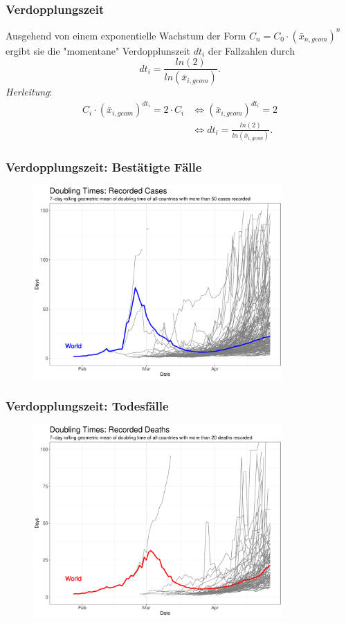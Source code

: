 \documentclass{beamer}
\begin{document}
\begin{frame}
	\frametitle{Verdopplungszeit}
	Ausgehend von einem exponentielle Wachstum der Form $C_n = C_0 \cdot (\bar{x}_{n, geom})^{n}$ ergibt sie die "momentane" Verdopplunszeit $dt_i$ der Fallzahlen durch $$dt_i = \frac{ln(2)}{ln(\bar{x}_{i, geom})}.$$
	\pause
	\emph{Herleitung}: 
	\begin{align*} C_i \cdot (\bar{x}_{i, geom})^{dt_i} = 2 \cdot C_i 
		 &\iff (\bar{x}_{i, geom})^{dt_i} = 2 \\
	 	&\iff dt_i = \frac{ln(2)}{ln(\bar{x}_{i, geom})}.
	\end{align*}
\end{frame}

\begin{frame}
	\frametitle{Verdopplungszeit: Bestätigte Fälle}
	\begin{figure}
		\centering
		\includegraphics[width = 270pt]{DT_confirmed}
	\end{figure}
\end{frame}

\begin{frame}
	\frametitle{Verdopplungszeit: Todesfälle}
	\begin{figure}
		\centering
		\includegraphics[width = 270pt]{DT_deaths}
	\end{figure}
\end{frame}
\end{document}
